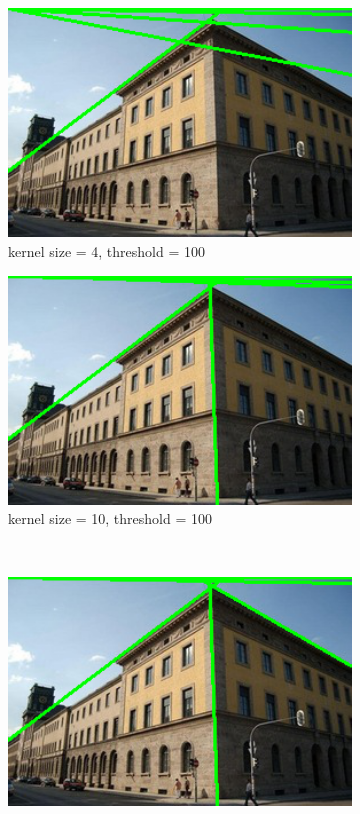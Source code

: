 \documentclass[12pt
,headinclude
,headsepline
,bibtotocnumbered
]{scrartcl}
\begin{document}
\begin{figure}[H]
    \centering
    \begin{subfigure}{0.45\textwidth}
        \includegraphics[width=1\textwidth]{plots/houghlines_4_100.png}
        \caption*{kernel size = 4, threshold = 100}
    \end{subfigure}
    \hfill
    \begin{subfigure}{0.45\textwidth}
        \includegraphics[width=1\textwidth]{plots/houghlines_10_100.png}
        \caption*{kernel size = 10, threshold = 100}
    \end{subfigure}
    \\
    \begin{subfigure}{0.45\textwidth}
        \includegraphics[width=1\textwidth]{plots/houghlines_20_80.png}

\end{subfigure}
\end{figure}
\end{document}
